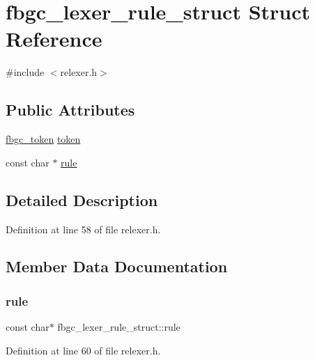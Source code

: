 \hypertarget{structfbgc__lexer__rule__struct}{}\section{fbgc\+\_\+lexer\+\_\+rule\+\_\+struct Struct Reference}
\label{structfbgc__lexer__rule__struct}


{\ttfamily \#include $<$relexer.\+h$>$}

\subsection*{Public Attributes}
\begin{DoxyCompactItemize}
\item 
\hyperlink{tokens_8h_a9d21ebbf42e602eb0cf502c867d20a7e}{fbgc\+\_\+token} \hyperlink{structfbgc__lexer__rule__struct_aaaad14f003c813291b9d121217737b56}{token}
\item 
const char $\ast$ \hyperlink{structfbgc__lexer__rule__struct_a44441ea33aba23c46e4fa3dd55d22043}{rule}
\end{DoxyCompactItemize}


\subsection{Detailed Description}


Definition at line 58 of file relexer.\+h.



\subsection{Member Data Documentation}
\mbox{\label{structfbgc__lexer__rule__struct_a44441ea33aba23c46e4fa3dd55d22043}} 
\subsubsection{\texorpdfstring{rule}{rule}}
{\footnotesize\ttfamily const char$\ast$ fbgc\+\_\+lexer\+\_\+rule\+\_\+struct\+::rule}



Definition at line 60 of file relexer.\+h.

